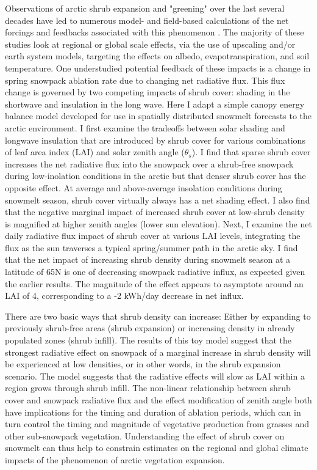 \documentclass[
10pt, %
letterpaper, %
oneside, %
headinclude,footinclude, %
BCOR5mm, %
]{scrartcl}
\begin{document}
Observations of arctic shrub expansion and "greening" over the last several decades \cite{epstein_recent_2013, walker_environment_2012,elmendorf_plot-scale_2012} have led to numerous model- and field-based calculations of the net forcings and feedbacks associated with this phenomenon \cite{juszak_arctic_2014, swann_changes_2010, swann_mid-latitude_2012, bonfils_influence_2012}. The majority of these studies look at regional or global scale effects, via the use of upscaling and/or earth system models, targeting the effects on albedo, evapotranspiration, and soil temperature. One understudied potential feedback of these impacts is a change in spring snowpack ablation rate due to changing net radiative flux. This flux change is governed by two competing impacts of shrub cover: shading in the shortwave and insulation in the long wave. Here I adapt a simple canopy energy balance model \cite{mahat_canopy_2012} developed for use in spatially distributed snowmelt forecasts to the arctic environment. I first examine the tradeoffs between solar shading and longwave insulation that are introduced by shrub cover for various combinations of leaf area index (LAI) and solar zenith angle ($\theta_s$). I find that sparse shrub cover increases the net radiative flux into the snowpack over a shrub-free snowpack during low-inolation conditions in the arctic but that denser shrub cover has the opposite effect. At average and above-average insolation conditions during snowmelt season, shrub cover virtually always has a net shading effect. I also find that the negative marginal impact of increased shrub cover at low-shrub density is magnified at higher zenith angles (lower sun elevation). Next, I examine the net daily radiative flux impact of shrub cover at various LAI levels, integrating the flux as the sun traverses a typical spring/summer path in the arctic sky. I find that the net impact of increasing shrub density during snowmelt season at a latitude of 65N is one of decreasing snowpack radiative influx, as expected given the earlier results. The magnitude of the effect appears to asymptote around an LAI of 4, corresponding to a -2 kWh/day decrease in net influx.

There are two basic ways that shrub density can increase: Either by expanding to previously shrub-free areas (shrub expansion) or increasing density in already populated zones (shrub infill). The results of this toy model suggest that the strongest radiative effect on snowpack of a marginal increase in shrub density will be experienced at low densities, or in other words, in the shrub expansion scenario. The model suggests that the radiative effects will slow as LAI within a region grows through shrub infill. The non-linear relationship between shrub cover and snowpack radiative flux and the effect modification of zenith angle both have implications for the timing and duration of ablation periods, which can in turn control the timing and magnitude of vegetative production from grasses and other sub-snowpack vegetation. Understanding the effect of shrub cover on snowmelt can thus help to constrain estimates on the regional and global climate impacts of the phenomenon of arctic vegetation expansion.
\end{document}
